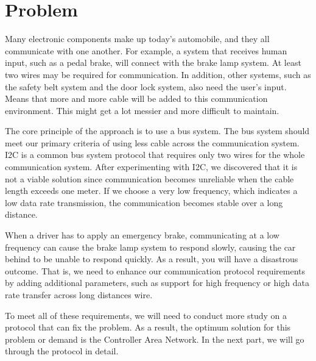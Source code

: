 
\section{Problem}

Many electronic components make up today's automobile, and they all communicate with one another. For example, a system that receives human input, such as a pedal brake, will connect with the brake lamp system. At least two wires may be required for communication. In addition, other systems, such as the safety belt system and the door lock system, also  need the user's input. Means that more and more cable will be added to this communication environment. This might get a lot messier and more difficult to maintain.

The core principle of the approach is to use a bus system. The bus system should meet our primary criteria of using less cable across the communication system. I2C is a common bus system protocol that requires only two wires for the whole communication system. After experimenting with I2C, we discovered that it is not a viable solution since communication becomes unreliable when the cable length exceeds one meter. If we choose a very low frequency, which indicates a low data rate transmission, the communication becomes stable over a long distance.

When a driver has to apply an emergency brake, communicating at a low frequency can cause the brake lamp system to respond slowly, causing the car behind to be unable to respond quickly. As a result, you will have a disastrous outcome. That is, we need to enhance our communication protocol requirements by adding additional parameters, such as support for high frequency or high data rate transfer across long distances wire.

To meet all of these requirements, we will need to conduct more study on a protocol that can fix the problem. As a result, the optimum solution for this problem or demand is the Controller Area Network. In the next part, we will go through the protocol in detail.